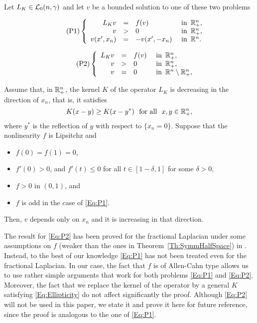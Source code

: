 \begin{theorem}
	\label{Th:SymmHalfSpace}
	Let $L_K\in \mathcal{L}_0(n,\gamma)$ and let $v$ be a bounded solution to one of these two problems
	
	\begin{equation}
	\leqnomode
	\tag{P1}
	\label{Eq:P1}
	\beqc{\PDEsystem}
	L_K v &=& f(v)   &\textrm{ in } \,\R^n_+,\\
	v &>& 0   &\textrm{ in } \,\R^n_+,\\
	v(x',x_n) &=& -v(x',-x_n)   &\textrm{ in } \,\R^n.
	\eeqc
	\end{equation}

	\begin{equation}
	\leqnomode
	\tag{P2}
	\label{Eq:P2}
	\beqc{\PDEsystem}
	L_K v &=& f(v)   &\textrm{ in } \,\R^n_+,\\
	v &>& 0   &\textrm{ in } \,\R^n_+,\\
	v &=& 0   &\textrm{ in } \,\R^n \setminus \R^n_+,
	\eeqc
	\end{equation}
		
	\reqnomode
	
	Assume that, in $\mathbb{R}^n_+$, the kernel $K$ of the operator $L_K$ is decreasing in the direction of $x_n$, that is, it satisfies
	$$
	K(x-y) \geq K(x-y^*) \,\,\,\,\text{for all } \,\, x,y\in \mathbb{R}^n_+,
	$$ 
	where $y^*$ is the reflection of $y$ with respect to $\{x_n = 0\}$. Suppose that the nonlinearity $f$ is Lipsitchz and
	\begin{itemize}
		\item $f(0) = f(1) = 0$,
		\item $f'(0)>0$, and $f'(t)\leq 0$ for all $t\in[1-\delta,1]$ for some $\delta>0$,
		\item $f>0$ in $(0,1)$, and
		\item $f$ is odd in the case of \eqref{Eq:P1}.
	\end{itemize}
	Then, $v$ depends only on $x_n$ and it is increasing in that direction.
\end{theorem}

The result for \eqref{Eq:P2} has been proved for the fractional Laplacian under some assumptions on $f$ (weaker than the ones in Theorem~\ref{Th:SymmHalfSpace}) in \cite{QuaasXia, BarriosEtAl-Monotonicity, BarriosEtAl-Symmetry, FallWethMonotonicity}. Instead, to the best of our knowledge \eqref{Eq:P1} has not been treated even for the fractional Laplacian. In our case, the fact that $f$ is of Allen-Cahn type allows us to use rather simple arguments that work for both problems \eqref{Eq:P1} and \eqref{Eq:P2}. Moreover, the fact that we replace the kernel of the operator by a general $K$ satisfying \eqref{Eq:Ellipticity} do not affect significantly the proof. Although \eqref{Eq:P2} will not be used in this paper, we state it and prove it here for future reference, since the proof is analogous to the one of \eqref{Eq:P1}.


